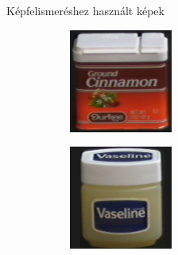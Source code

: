 \documentclass{beamer}
\begin{document}
\begin{frame}{Képfelismeréshez használt képek}
\begin{figure}
\begin{subfigure}{55pt}
        \end{subfigure}
        \begin{subfigure}{55pt}
            \centering
        \includegraphics[width=\textwidth]{figures/coil_original/39.png}
        
        \end{subfigure}
        \begin{subfigure}{55pt}
            \centering
        \includegraphics[width=\textwidth]{figures/coil_original/55.png}
        

\end{subfigure}
\end{figure}
\end{frame}
\end{document}

